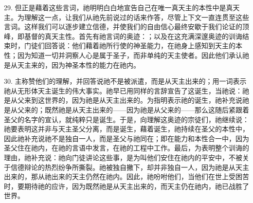 29. 但正是藉着这些言词，祂明明白白地宣告自己在唯一真天主的本性中是真天主。为理解这一点，让我们从祂先前说过的话来作答，尽管上下文一直连贯至这些言词。这样我们可以逐步建立信德，并使我们的自由信心最终安歇于我们论证的顶峰，即基督的真天主性。首先有祂言词的奥迹：；以及在这充满深邃奥迹的训诲结束时，门徒们回答说：他们藉着祂所行使的神圣能力，在祂身上感知到天主的本性；因为知道一切并洞察人心是属于圣子，而非单纯的天主使者。因此他们承认祂是从天主来的，因为神圣本性的能力在祂内。\par

30. 主称赞他们的理解，并回答说祂不是被派遣，而是从天主出来的；用一词表示祂从无形体天主诞生的伟大事实。祂早已用同样的言辞宣告了这诞生，当祂说：祂是从父来到这世界的，因为祂是从天主出来的。为指明表示祂的诞生，祂补充说祂是从父来的；既然祂是从天主出来的——因为祂是从父来的——那么这随后紧跟着圣父的名字的宣认，就纯粹只是诞生。于是，向理解这奥迹的宗徒们，祂继续说：祂要表明这并非与天主圣父分离，而是诞生，藉着诞生，祂持续在圣父的本性中，因此祂补充说祂不是独自一人，而是圣父与祂同在；即在能力和本性合一中，因为圣父住在祂内，在祂的言语中发言，在祂的工程中工作。最后，为表明整个训诲的理由，祂补充说：祂向门徒讲论这些事，是为叫他们安住在祂内的平安中，不被关于信德辩论的热烈纷争所撕裂。祂被独自撇下，却并非独自一人，因为祂是从天主出来的，那从祂出来的天主仍然在祂内。因此，祂吩咐他们，当他们在世上受困苦时，要期待祂的应许，因为既然祂是从天主出来的，而天主仍在祂内，祂已战胜了世界。\par

